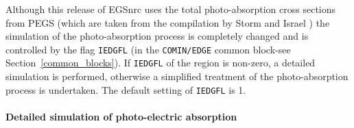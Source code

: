 Although this release of EGSnrc uses the total photo-absorption
cross sections from PEGS (which are taken from the
compilation by Storm and Israel \cite{SI70})
the simulation of the photo-absorption process
is completely changed and is controlled
by the flag {\tt IEDGFL}
(in the {\tt COMIN/EDGE} common block-see Section~\ref{common_blocks}). If {\tt IEDGFL} of the
region is non-zero, a detailed simulation is performed,
otherwise a simplified treatment of the photo-absorption process
is undertaken. The default setting of {\tt IEDGFL} is 1.

\paragraph{Detailed simulation of photo-electric absorption}\hfill
\label{photo_detailed}

